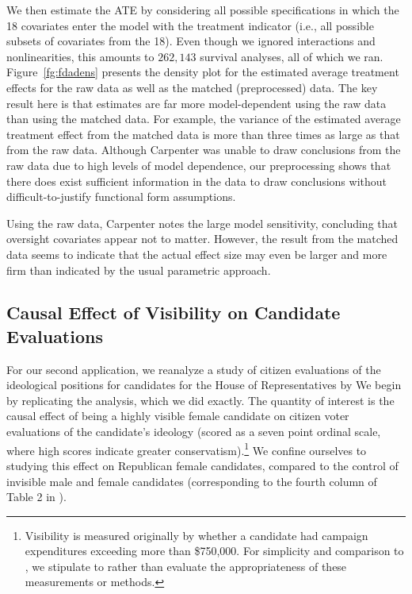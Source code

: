 \documentclass[11pt,titlepage]{article}
\begin{document}
We then estimate the ATE by considering all possible specifications in
which the 18 covariates enter the model with the treatment indicator
(i.e., all possible subsets of covariates from the 18).  Even though
we ignored interactions and nonlinearities, this amounts to $262,143$
survival analyses, all of which we ran. Figure~\ref{fg:fdadens}
presents the density plot for the estimated average treatment effects
for the raw data as well as the matched (preprocessed) data.  The key
result here is that estimates are far more model-dependent using the
raw data than using the matched data.  For example, the variance of
the estimated average treatment effect from the matched data is more
than three times as large as that from the raw data.  Although
Carpenter was unable to draw conclusions from the raw data due to
high levels of model dependence, our preprocessing shows that there
does exist sufficient information in the data to draw conclusions
without difficult-to-justify functional form assumptions.

Using the raw data, Carpenter notes the large model sensitivity,
concluding that oversight covariates appear not to matter.  However,
the result from the matched data seems to indicate that the actual
effect size may even be larger and more firm than indicated by the
usual parametric approach.

\subsection{Causal Effect of Visibility on Candidate
  Evaluations}

For our second application, we reanalyze a study of citizen
evaluations of the ideological positions for candidates for the House
of Representatives by \citet{Koch02} We begin by replicating the
analysis, which we did exactly.  The quantity of interest is the
causal effect of being a highly visible female candidate on citizen
voter evaluations of the candidate's ideology (scored as a seven point
ordinal scale, where high scores indicate greater
conservatism).\footnote{Visibility is measured originally by whether a
  candidate had campaign expenditures exceeding more than \$750,000.
  For simplicity and comparison to \citet{Koch02}, we stipulate to
  rather than evaluate the appropriateness of these measurements or
  methods.}  We confine ourselves to studying this effect on
Republican female candidates, compared to the control of invisible
male and female candidates (corresponding to the fourth column of
Table 2 in \citet[p.  459]{Koch02}).
\end{document}
